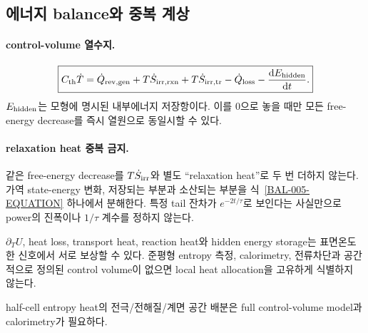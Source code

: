 \subsection{에너지 balance와 중복 계상}\label{THM-CH2-ENERGY}

\paragraph{ control-volume 열수지.}
\begin{equation}
\boxed{
C_{\rm th}\dot T
=\dot Q_{\mathrm{rev},\rm gen}
+T\dot S_{\mathrm{irr},\rm rxn}
+T\dot S_{\mathrm{irr},\rm tr}
-\dot Q_{\rm loss}
-\frac{\mathrm d E_{\rm hidden}}{\mathrm d t}.
}
\label{BAL-005-EQUATION}
\end{equation}
$E_{\rm hidden}$는 모형에 명시된 내부에너지 저장항이다.
이를 0으로 놓을 때만 모든 free-energy decrease를 즉시 열원으로
동일시할 수 있다.

\paragraph{ relaxation heat 중복 금지.}
같은 free-energy decrease를
$T\dot S_{\mathrm{irr}}$와 별도 ``relaxation heat''로 두 번 더하지 않는다.
가역 state-energy 변화, 저장되는 부분과 소산되는 부분을
식~\eqref{BAL-005-EQUATION} 하나에서 분해한다. 특정 tail
잔차가 $e^{-2t/\tau}$로 보인다는 사실만으로 power의 진폭이나
$1/\tau$ 계수를 정하지 않는다.

\begin{identifiability}
$\partial_TU$, heat loss, transport heat, reaction heat와 hidden
energy storage는 표면온도 한 신호에서 서로 보상할 수 있다.
준평형 entropy 측정, calorimetry, 전류차단과 공간적으로 정의된
control volume이 없으면 local heat allocation을 고유하게
식별하지 않는다.
\end{identifiability}

\begin{openitem}
half-cell entropy heat의 전극/전해질/계면 공간 배분은 full
control-volume model과 calorimetry가 필요하다.
\end{openitem}
